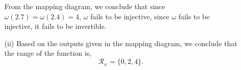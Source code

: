 \documentclass[12pt]{article} %
\begin{document}
\begin{qstn}
\begin{enumerate}[label=(\alph*)]
\begin{solution}
\begin{enumerate}[label=(\alph*)]
\begin{center}
        \end{center}
        From the mapping diagram, we conclude that since $\omega(2.7) = \omega(2.4) = 4$, $\omega$ fails
        to be injective, since  $\omega$ fails to be injective, it fails to be invertible.

      \item[(ii)] Based on the outputs given in the mapping diagram, we conclude that the range of the function is,
        \[
            \mathcal{R}_\omega = \{0,2,4\} 
        .\] 
    \end{enumerate}
  \end{solution}
  \end{enumerate}

\end{qstn}

\newpage
\end{document}
